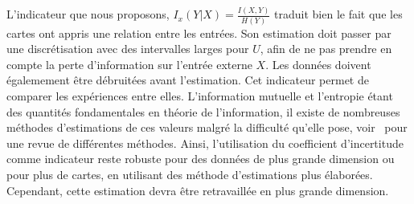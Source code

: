 L'indicateur que nous proposons, $I_x(Y|X) = \frac{I(X,Y)}{H(Y)}$ traduit bien le fait que les cartes ont appris une relation entre les entrées. Son estimation doit passer par une discrétisation avec des intervalles larges pour $U$, afin de ne pas prendre en compte la perte d'information sur l'entrée externe $X$.
Les données doivent égalemement être débruitées avant l'estimation.
Cet indicateur permet de comparer les expériences entre elles.
L'information mutuelle et l'entropie étant des quantités fondamentales en théorie de l'information, il existe de nombreuses méthodes d'estimations de ces valeurs malgré la difficulté qu'elle pose, voir~\cite{Doquire2012ACO} pour une revue de différentes méthodes. Ainsi, l'utilisation du coefficient d'incertitude comme indicateur reste robuste pour des données de plus grande dimension ou pour plus de cartes, en utilisant des méthode d'estimations plus élaborées. Cependant, cette estimation devra être retravaillée en plus grande dimension. 





